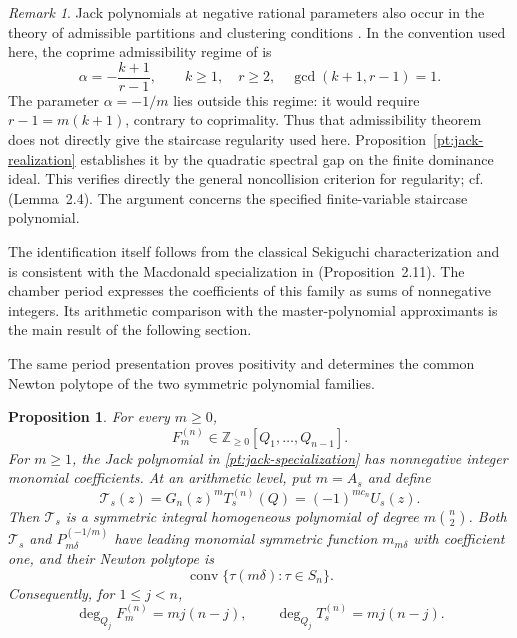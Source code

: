 \documentclass[11pt]{amsart}
\newtheorem{proposition}[theorem]{Proposition}
\theoremstyle{definition}
\theoremstyle{remark}
\newtheorem{remark}[theorem]{Remark}
\numberwithin{equation}{section}
\newcommand{\Z}{\mathbb Z}
\begin{document}
\begin{remark}\label{pt:jack-regularity-scope}
Jack polynomials at negative rational parameters also occur in
the theory of admissible partitions and clustering conditions
\cite{FJMM02,CDL22}. In the convention used here, the coprime
admissibility regime of \cite{FJMM02} is
\[
 \alpha=-\frac{k+1}{r-1},\qquad k\geq1,\quad r\geq2,
 \quad \gcd(k+1,r-1)=1.
\]
The parameter $\alpha=-1/m$ lies outside this regime: it would
require $r-1=m(k+1)$, contrary to coprimality. Thus that
admissibility theorem does not directly give the staircase
regularity used here. Proposition~\ref{pt:jack-realization}
establishes it by the quadratic spectral gap on the finite
dominance ideal. This verifies directly the general noncollision
criterion for regularity; cf.\ \cite{FJMM02} (Lemma~2.4).
The argument concerns the specified finite-variable staircase
polynomial.

The identification itself follows from the classical Sekiguchi
characterization and is consistent with the Macdonald
specialization in \cite{K21} (Proposition~2.11).
The chamber period expresses the coefficients of this family
as sums of nonnegative integers. Its arithmetic comparison with the
master-polynomial approximants is the main result of the
following section.
\end{remark}


The same period presentation proves positivity and determines
the common Newton polytope of the two symmetric polynomial
families.

\begin{proposition}\label{pt:positive-support}
For every $m\geq0$,
\[
 F_m^{(n)}\in\Z_{\geq0}[Q_1,\ldots,Q_{n-1}].
\]
For $m\geq1$, the Jack polynomial in
\eqref{pt:jack-specialization} has nonnegative integer monomial
coefficients. At an arithmetic level, put $m=A_s$ and define
\begin{equation}\label{pt:symmetric-master}
 \mathcal T_s(z)=G_n(z)^mT_s^{(n)}(Q)
 =(-1)^{mc_n}U_s(z).
\end{equation}
Then $\mathcal T_s$ is a symmetric integral homogeneous
polynomial of degree $m\binom n2$. Both $\mathcal T_s$ and
$P_{m\delta}^{(-1/m)}$ have leading monomial symmetric
function $m_{m\delta}$ with coefficient one, and their Newton
polytope is
\[
 \operatorname{conv}\{\tau(m\delta):\tau\in S_n\}.
\]
Consequently, for $1\leq j<n$,
\begin{equation}\label{pt:exact-coordinate-degrees}
 \deg_{Q_j}F_m^{(n)}=m j(n-j),\qquad
 \deg_{Q_j}T_s^{(n)}=m j(n-j).
\end{equation}
\end{proposition}
\end{document}
